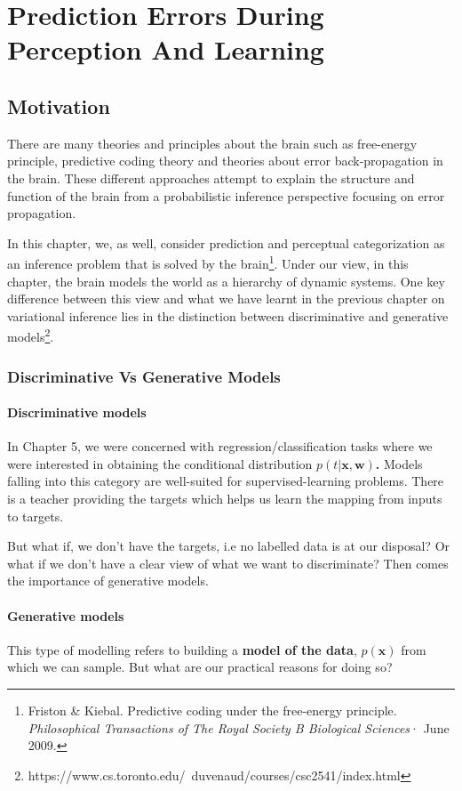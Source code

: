 \documentclass[main]{subfiles}
\begin{document}
\newpage
\section{Prediction Errors During Perception And Learning}
\subsection{Motivation}
There are many theories and principles about the brain such as free-energy principle, predictive coding theory and theories about error back-propagation in the brain. These different approaches attempt to explain the structure and function of the brain from a probabilistic inference perspective focusing on error propagation. 

In this chapter, we, as well, consider prediction and perceptual categorization as an inference problem that is solved by the brain\footnote{Friston \& Kiebal. Predictive coding under the free-energy principle. \textit{Philosophical Transactions of The Royal Society B Biological Sciences}· June 2009.}. Under our view, in this chapter, the brain models the world as a hierarchy of dynamic systems. One key difference between this view and what we have learnt in the previous chapter on variational inference lies in the distinction between discriminative and generative models\footnote{https://www.cs.toronto.edu/~duvenaud/courses/csc2541/index.html}.


\subsubsection{Discriminative Vs Generative Models}


\paragraph{Discriminative models}
In Chapter 5, we were concerned with regression/classification tasks where we were interested in obtaining the conditional distribution \textbf{$p(t|\bm{x},\bm{w})$. }
\noindent
Models falling into this category are well-suited for supervised-learning problems. There is a teacher providing the targets which helps us learn the mapping from inputs to targets. 

\noindent
But what if, we don't have the targets, i.e no labelled data is at our disposal? Or what if we don't have a clear view of what we want to discriminate? Then comes the importance of generative models.

\paragraph{Generative models}
This type of modelling refers to building a \textbf{model of the data}, $p(\bm{x})$ from which we can sample. But what are our practical reasons for doing so?
\end{document}

